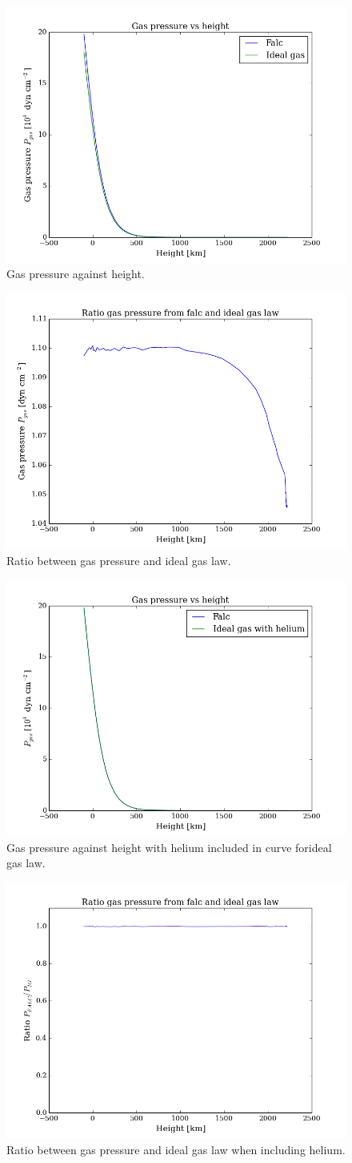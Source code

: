\documentclass{aa}   %
\begin{document}
\begin{figure}
 \includegraphics[width=.49\textwidth]{gas_height.png}
 \caption{Gas pressure against height.}
 \label{gas_height} 
\end{figure}

\begin{figure}
 \includegraphics[width=.49\textwidth]{gas_height_ratio.png}
 \caption{Ratio between gas pressure and ideal gas law.}
 \label{gas_height_ratio} 
\end{figure}

\begin{figure}
 \includegraphics[width=.49\textwidth]{gas_height_hel.png}
 \caption{Gas pressure against height with helium included in curve forideal gas law.}
 \label{gas_height_hel} 
\end{figure}

\begin{figure}
 \includegraphics[width=.49\textwidth]{gas_height_ratio_hel.png}
 \caption{Ratio between gas pressure and ideal gas law when including helium.}
 \label{gas_height_ratio_hel} 
\end{figure}
\end{document}
